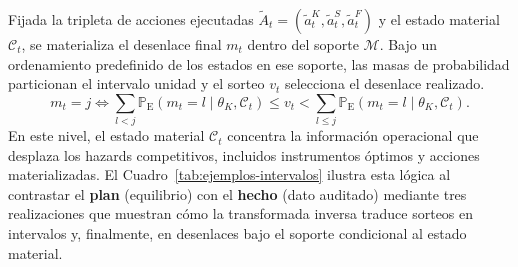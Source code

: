 \documentclass[12pt]{article}
\theoremstyle{definition}
\theoremstyle{remark}
\newcommand{\ProbE}{\mathbb{P}_{\mathrm{E}}}
\newcommand{\1}{\mathbf{1}}
\begin{document}
Fijada la tripleta de acciones ejecutadas $\tilde{A}_t = (\tilde{a}_t^K, \tilde{a}_t^S, \tilde{a}_t^F)$ y el estado material $\mathcal C_t$, se materializa el desenlace final $m_t$ dentro del soporte $\mathcal{M}$. Bajo un ordenamiento predefinido de los estados en ese soporte, las masas de probabilidad particionan el intervalo unidad y el sorteo $v_t$ selecciona el desenlace realizado.
\begin{equation}
\label{eq:sorteo-m}
m_t = j \iff \sum_{l < j} \ProbE(m_t = l \mid \theta_K,\mathcal C_t) \le v_t < \sum_{l \le j} \ProbE(m_t = l \mid \theta_K,\mathcal C_t).
\end{equation}
En este nivel, el estado material $\mathcal C_t$ concentra la información operacional que desplaza los hazards competitivos, incluidos instrumentos óptimos y acciones materializadas. El Cuadro~\ref{tab:ejemplos-intervalos} ilustra esta lógica al contrastar el \textbf{plan} \textup{(}equilibrio\textup{)} con el \textbf{hecho} \textup{(}dato auditado\textup{)} mediante tres realizaciones que muestran cómo la transformada inversa traduce sorteos en intervalos y, finalmente, en desenlaces bajo el soporte condicional al estado material.
\end{document}
